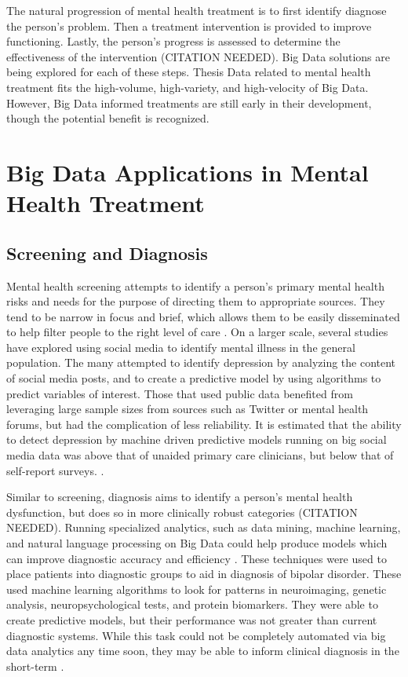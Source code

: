 \documentclass[sigconf]{acmart}
\begin{document}
The natural progression of mental health treatment is to first identify diagnose the person's problem. Then a treatment intervention is provided to improve functioning. Lastly, the person's progress is assessed to determine the effectiveness of the intervention (CITATION NEEDED). Big Data solutions are being explored for each of these steps.
Thesis
Data related to mental health treatment fits the high-volume, high-variety, and high-velocity of Big Data. However, Big Data informed treatments are still early in their development, though the potential benefit is recognized.

\section{Big Data Applications in Mental Health Treatment}

\subsection{Screening and Diagnosis}
Mental health screening attempts to identify a person's primary mental health risks and needs for the purpose of directing them to appropriate sources. They tend to be narrow in focus and brief, which allows them to be easily disseminated to help filter people to the right level of care \cite{apapractscreeassess}. 
On a larger scale, several studies have explored using social media to identify mental illness in the general population. The many attempted to identify depression by analyzing the content of social media posts, and to create a predictive model by using algorithms to predict variables of interest. Those that used public data benefited from leveraging large sample sizes from sources such as Twitter or mental health forums, but had the complication of less reliability. It is estimated that the ability to detect depression by machine driven predictive models running on big social media data was above that of unaided primary care clinicians, but below that of self-report surveys. \cite{detectdepressionsocialmedia}.

Similar to screening, diagnosis aims to identify a person's mental health dysfunction, but does so in more clinically robust categories (CITATION NEEDED). 
Running specialized analytics, such as data mining, machine learning, and natural language processing on Big Data could help produce models which can improve diagnostic accuracy and efficiency \cite{bigdatabipolar}. These techniques were used to place patients into diagnostic groups to aid in diagnosis of bipolar disorder. These used machine learning algorithms to look for patterns in neuroimaging, genetic analysis, neuropsychological tests, and protein biomarkers. They were able to create predictive models, but their performance was not greater than current diagnostic systems. While this task could not be completely automated via big data analytics any time soon, they may be able to inform clinical diagnosis in the short-term \cite{machinelearnbipolar}.
\end{document}
